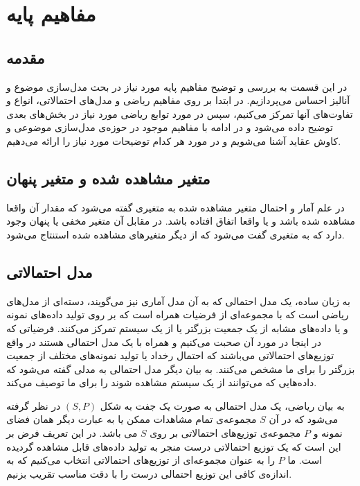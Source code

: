 \chapter{مفاهیم پایه}
\thispagestyle{empty}
\section{مقدمه}
در این قسمت به بررسی‌ و توضیح  مفاهیم پایه مورد نیاز در بحث مدل‌سازی موضوع
و آنالیز احساس
می‌‌پردازیم. در ابتدا بر روی مفاهیم ریاضی‌ و مدل‌های احتمالاتی،
   انواع و تفاوت‌های آنها تمرکز می‌‌کنیم، سپس در مورد توابع ریاضی مورد نیاز در بخش‌های بعدی توضیح داده می‌شود و در 
ادامه با مفاهیم موجود در حوزه‌ی مدل‌سازی موضوعی و کاوش عقاید
 آشنا می‌‌شویم و در مورد هر کدام توضیحات مورد نیاز را ارائه می‌‌دهیم. 

\section{متغیر مشاهده شده و متغیر پنهان }
در علم آمار
و احتمال متغیر مشاهده شده
به متغیری گفته می‌‌شود که مقدار آن واقعا مشاهده شده باشد و یا واقعا اتفاق افتاده باشد. در مقابل آن متغیر مخفی‌ یا پنهان
وجود دارد که به متغیری گفت می‌‌شود که از دیگر متغیر‌های مشاهده شده استنتاج
 می‌‌شود.

\section{مدل‌ احتمالاتی}
به زبان ساده، یک مدل احتمالی‌ که به آن مدل آماری
نیز می‌‌گویند، دسته‌ای‌ از مدل‌های ریاضی‌ است که با مجموعه‌ای از فرضیات  همراه است که بر روی تولید داده‌های نمونه
و یا داده‌های مشابه از یک جمعیت بزرگتر یا از یک سیستم تمرکز می‌‌کنند. فرضیاتی که در اینجا در مورد آن صحبت می‌‌کنیم و همراه با یک مدل احتمالی‌ هستند در واقع توزیع‌های احتمالاتی
می‌‌باشند که احتمال رخداد یا تولید نمونه‌های مختلف از جمعیت بزرگتر را برای ما مشخص می‌‌کنند. به بیان دیگر مدل احتمالی‌ به مدلی‌ گفته می‌‌شود که داده‌هایی که می‌‌توانند از یک سیستم مشاهده شوند را برای ما توصیف می‌‌کند.

به بیان ریاضی‌، یک مدل احتمالی‌ به صورت یک جفت به شکل
$(S,P)$
در نظر گرفته می‌‌شود که در آن
$S$
مجموعه‌ی تمام مشاهدات ممکن یا به عبارت دیگر همان فضای نمونه
 و
$P$
مجموعه‌ی توزیع‌های احتمالاتی بر روی
$S$
می‌ باشد. در این تعریف فرض بر این است که یک توزیع احتمالاتی درست منجر به تولید داده‌های قابل مشاهده گردیده است. ما
$P$
را به عنوان مجموعه‌ای از توزیع‌های احتمالاتی انتخاب می‌‌کنیم که به اندازه‌ی کافی‌ این توزیع احتمالی‌ درست را با دقت مناسب تقریب بزنیم.

